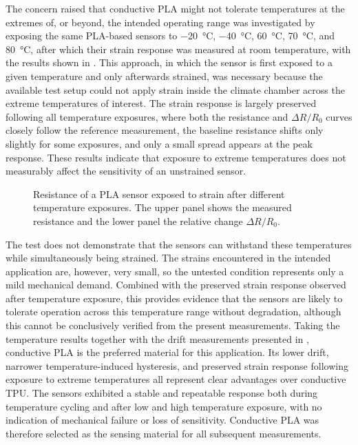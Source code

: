 The concern raised that conductive PLA might not tolerate temperatures at the extremes of, or beyond, the intended operating range was investigated by exposing the same PLA-based sensors to \SI{-20}{\celsius}, \SI{-40}{\celsius}, \SI{60}{\celsius}, \SI{70}{\celsius}, and \SI{80}{\celsius}, after which their strain response was measured at room temperature, with the results shown in . This approach, in which the sensor is first exposed to a given temperature and only afterwards strained, was necessary because the available test setup could not apply strain inside the climate chamber across the extreme temperatures of interest. The strain response is largely preserved following all temperature exposures, where both the resistance and $\Delta R / R_0$ curves closely follow the reference measurement, the baseline resistance shifts only slightly for some exposures, and only a small spread appears at the peak response. These results indicate that exposure to extreme temperatures does not measurably affect the sensitivity of an unstrained sensor.

\begin{figure}[!b]
\centering

    \caption{Resistance of a PLA sensor exposed to strain after different temperature exposures. The upper panel shows the measured resistance and the lower panel the relative change $\Delta R/R_0$.}
    \label{fig:PLA_after_temp_limits}
\end{figure}

The test does not demonstrate that the sensors can withstand these temperatures while simultaneously being strained. The strains encountered in the intended application are, however, very small, so the untested condition represents only a mild mechanical demand. Combined with the preserved strain response observed after temperature exposure, this provides evidence that the sensors are likely to tolerate operation across this temperature range without degradation, although this cannot be conclusively verified from the present measurements.
Taking the temperature results together with the drift measurements presented in , conductive PLA is the preferred material for this application. Its lower drift, narrower temperature-induced hysteresis, and preserved strain response following exposure to extreme temperatures all represent clear advantages over conductive TPU. The sensors exhibited a stable and repeatable response both during temperature cycling and after low and high temperature exposure, with no indication of mechanical failure or loss of sensitivity. Conductive PLA was therefore selected as the sensing material for all subsequent measurements.